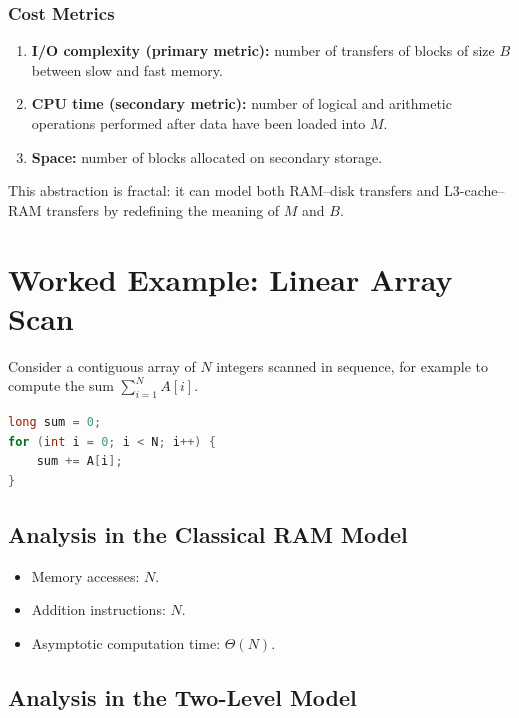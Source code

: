 \subsubsection{Cost Metrics}

\begin{enumerate}
  \item \textbf{I/O complexity (primary metric):} number of transfers of
    blocks of size $B$ between slow and fast memory.
  \item \textbf{CPU time (secondary metric):} number of logical and
    arithmetic operations performed after data have been loaded into $M$.
  \item \textbf{Space:} number of blocks allocated on secondary storage.
\end{enumerate}

This abstraction is fractal: it can model both RAM--disk transfers and
L3-cache--RAM transfers by redefining the meaning of $M$ and $B$.

\section{Worked Example: Linear Array Scan}
\label{sec:linear-scan}

Consider a contiguous array of $N$ integers scanned in sequence, for example
to compute the sum $\sum_{i=1}^{N} A[i]$.

\begin{lstlisting}[style=code, language=C, caption={Sequential array scan}, label={lst:linear-scan}]
long sum = 0;
for (int i = 0; i < N; i++) {
    sum += A[i];
}
\end{lstlisting}

\subsection{Analysis in the Classical RAM Model}

\begin{itemize}
  \item Memory accesses: $N$.
  \item Addition instructions: $N$.
  \item Asymptotic computation time: $\Theta(N)$.
\end{itemize}

\subsection{Analysis in the Two-Level Model}

